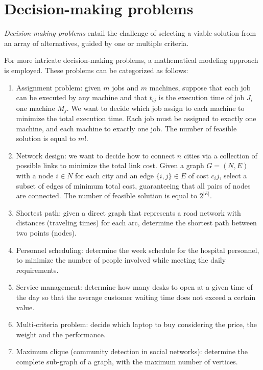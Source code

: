 \section{Decision-making problems}

\begin{definition}
    \emph{Decision-making problems} entail the challenge of selecting a viable solution from an array of alternatives, guided by one or multiple criteria.
\end{definition}
For more intricate decision-making problems, a mathematical modeling approach is employed. 
These problems can be categorized as follows:
\begin{enumerate}
    \item Assignment problem: given $m$ jobs and $m$ machines, suppose that each job can be executed by any machine and that $t_{ij}$ is the execution time of job $J_i$ one
        machine $M_j$. We want to decide which job assign to each machine to minimize the total execution time. Each job must be assigned to exactly one machine, and each 
        machine to exactly one job. The number of feasible solution is equal to $m!$. 
    \item Network design: we want to decide how to connect $n$ cities via a collection of possible links to minimize the total link cost. 
        Given a graph $G=(N,E)$ with a node $i \in N$ for each city and an edge $\{i,j\} \in E$ of cost $c_ij$, select a subset of edges of minimum total cost, guaranteeing that 
        all pairs of nodes are connected. The number of feasible solution is equal to $2^{\left\lvert E \right\rvert}$. 
    \item Shortest path: given a direct graph that represents a road network with distances (traveling times) for each arc, determine the shortest path between two points (nodes).
    \item Personnel scheduling: determine the week schedule for the hospital personnel, to minimize the number of people involved while meeting the daily requirements.
    \item Service management: determine how many desks to open at a given time of the day so that the average customer waiting time does not exceed a certain value. 
    \item Multi-criteria problem: decide which laptop to buy considering the price, the weight and the performance. 
    \item Maximum clique (community detection in social networks): determine the complete sub-graph of a graph, with the maximum number of vertices.
\end{enumerate}